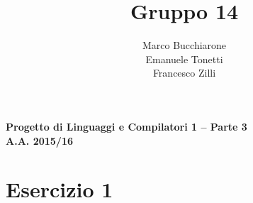 \documentclass[a4paper,oneside,11pt]{article}
\makeatletter
\renewcommand\and{\\}
\renewcommand\maketitle{%
\bigskip\bigskip\bigskip\bigskip%
\begin{center}\bfseries\large%
Progetto di Linguaggi e Compilatori 1 -- Parte 3 \\ A.A. 2015/16\\%
\end{center}%
\bigskip%
\begin{center}\bfseries\LARGE \@title  \end{center}%
\bigskip%
\begin{center}\bfseries\large \@author \end{center}%
\bigskip\bigskip}
\makeatother
\begin{document}
\title{Gruppo 14}
\author{Marco Bucchiarone \and Emanuele Tonetti \and Francesco Zilli}
\maketitle
%
\section*{Esercizio 1}
\end{document}
